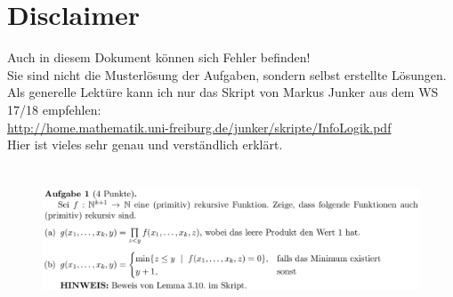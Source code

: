 \documentclass[a4paper]{scrartcl}%
\begin{document}
\section*{Disclaimer}
\label{sec:disclaimer}
Auch in diesem Dokument können sich Fehler befinden!\\
Sie sind nicht die Musterlösung der Aufgaben, sondern selbst erstellte Lösungen.\\

Als generelle Lektüre kann ich nur das Skript von Markus Junker aus dem WS 17/18 empfehlen:\\
\url{http://home.mathematik.uni-freiburg.de/junker/skripte/InfoLogik.pdf}\\
Hier ist vieles sehr genau und verständlich erklärt.
\section*{}%
\label{sec:aufgabe_1}

    \begin{figure}[H]
        \includegraphics[scale=0.3]{./A-1.png}
        \label{fig:}
    \end{figure}
\end{document}
